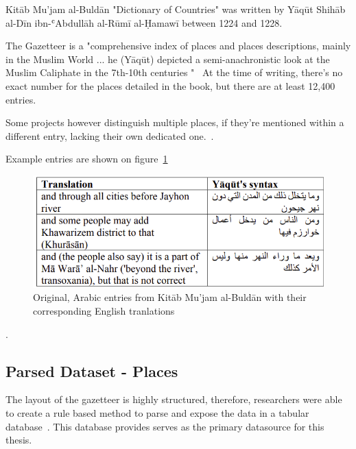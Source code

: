 Kitāb Mu'jam al-Buldān \cite{Yaqut} "Dictionary of Countries" was written by Yāqūt Shihāb al-Dīn ibn-ʿAbdullāh al-Rūmī al-Ḥamawī
between 1224 and 1228.

The Gazetteer is a "comprehensive index of places and places descriptions, mainly in the Muslim World ...
he (Yāqūt) depicted a semi-anachronistic look at the Muslim Caliphate in the 7th-10th centuries
"~\cite{YaqutRB}
At the time of writing, there's no exact number for the places detailed in the book, but there are at least 12,400 entries.

Some projects however distinguish multiple places, if they're mentioned within a different entry, lacking
their own dedicated one.~\cite{AlTurayya}.

Example entries are shown on figure~\ref{fig:yaqut-entries}


\begin{figure}[h] %
    \centering %
    \includegraphics[width=0.7\linewidth]{figures/yaqut-with-translation} %
    \caption{Original, Arabic entries from Kitāb Mu'jam al-Buldān with their corresponding English tranlations~\cite{YaqutRB}} %
    \label{fig:yaqut-entries} %
\end{figure}.

\subsection{Parsed Dataset - Places}
The layout of the gazetteer is highly structured, therefore, researchers were able to create a rule based method to parse
and expose the data in a tabular database~\cite{YaqutRB}.
This database provides serves as the primary datasource for this thesis.

